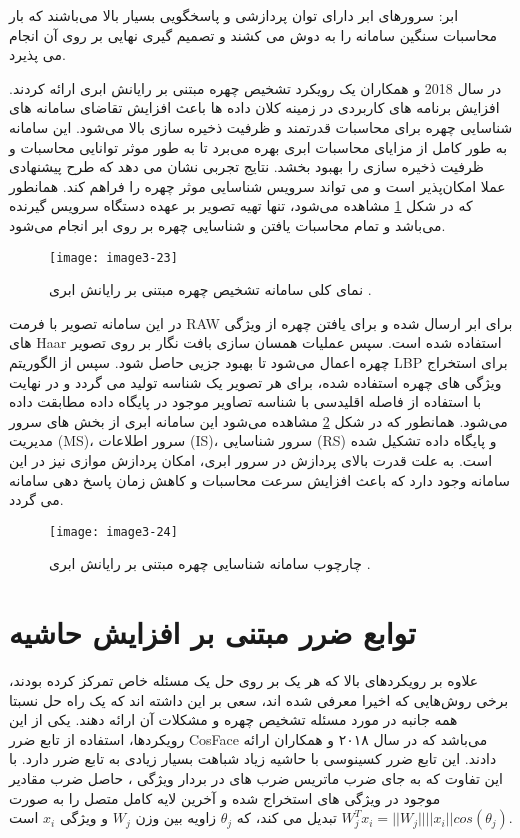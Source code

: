 \noindent
ابر: سرورهای ابر دارای توان پردازشی و پاسخگویی بسیار بالا می‌باشند که بار محاسبات سنگین سامانه را به دوش می کشند و تصمیم گیری نهایی بر روی آن انجام می پذیرد.

\noindent
در سال 2018  و همکاران \cite{HU2018582} یک رویکرد تشخیص چهره مبتنی بر رایانش ابری ارائه کردند. افزایش برنامه های کاربردی در زمینه کلان داده ها باعث افزایش تقاضای سامانه های شناسایی چهره برای محاسبات قدرتمند و ظرفیت ذخیره سازی بالا می‌شود. این سامانه به طور کامل از مزایای محاسبات ابری بهره می‌برد تا به طور موثر توانایی محاسبات و ظرفیت ذخیره سازی را بهبود بخشد. نتایج تجربی نشان می دهد که طرح پیشنهادی عملا امکان‌پذیر است و می تواند سرویس شناسایی موثر چهره را فراهم کند. همانطور که در شکل \ref{image3-23} مشاهده می‌شود، تنها تهیه تصویر بر عهده دستگاه سرویس گیرنده می‌باشد و تمام محاسبات یافتن و شناسایی چهره بر روی ابر انجام می‌شود.
 \begin{figure}[h]
\centering
  \texttt{[image: image3-23]}
  \caption{نمای کلی سامانه تشخیص چهره مبتنی بر رایانش ابری \cite{HU2018582}.}
  \label{image3-23}
\end{figure}

\noindent
در این سامانه تصویر با فرمت RAW برای ابر ارسال شده و برای یافتن چهره از ویژگی های Haar استفاده شده است. سپس عملیات همسان سازی بافت نگار بر روی تصویر چهره اعمال می‌شود تا بهبود جزیی حاصل شود. سپس از الگوریتم LBP برای استخراج ویژگی های چهره استفاده شده، برای هر تصویر یک شناسه تولید می گردد و در نهایت با استفاده از فاصله اقلیدسی با شناسه تصاویر موجود در پایگاه داده مطابقت داده می‌شود. همانطور که در شکل \ref{image3-24} مشاهده می‌شود این سامانه ابری از بخش های سرور مدیریت (MS)، سرور اطلاعات (IS)، سرور شناسایی (RS) و پایگاه داده تشکیل شده است. به علت قدرت بالای پردازش در سرور ابری، امکان پردازش موازی نیز در این سامانه وجود دارد که باعث افزایش سرعت محاسبات و کاهش زمان پاسخ دهی سامانه می گردد. 

\begin{figure}[h]
\centering
  \texttt{[image: image3-24]}
  \caption{چارچوب سامانه شناسایی چهره مبتنی بر رایانش ابری \cite{HU2018582}.}
  \label{image3-24}
\end{figure}

\section{توابع ضرر مبتنی بر افزایش حاشیه}
علاوه بر رویکردهای بالا که هر یک بر روی حل یک مسئله خاص تمرکز کرده بودند، برخی روش‌هایی که اخیرا معرفی شده اند، سعی بر این داشته اند که یک راه حل نسبتا همه جانبه در مورد مسئله تشخیص چهره و مشکلات آن ارائه دهند. یکی از این رویکردها، استفاده از تابع ضرر CosFace می‌باشد که در سال ۲۰۱۸  و همکاران \cite{wang2018cosface} ارائه دادند. این تابع ضرر کسینوسی با حاشیه زیاد  شباهت بسیار زیادی به تابع ضرر  دارد. با این تفاوت که به جای ضرب ماتریس ضرب های  در بردار ویژگی ، حاصل ضرب مقادیر موجود در ویژگی های استخراج شده و آخرین لایه کامل
متصل را به صورت
$W_j^T x_i = ||W_j|| ||x_i|| cos(θ_j)$
تبدیل می کند، که $\theta_j$ زاویه بین وزن $W_j$ و ویژگی $x_i$ است.

